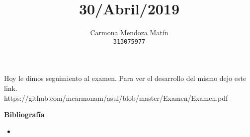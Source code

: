 \documentclass[11pt, a4paper]{report}
\begin{document}
\title{30/Abril/2019}
\author{
  Carmona Mendoza Mat\'in\\
  \texttt{313075977}
}
\date{}
\maketitle

Hoy le dimos seguimiento al examen. Para ver el desarrollo del mismo dejo este
link. \\

https://github.com/mcarmonam/asul/blob/master/Examen/Examen.pdf

\newpage

\textbf{Bibliografía} \\

\begin{itemize}

\item \url{}


\end{itemize}
\end{document}
